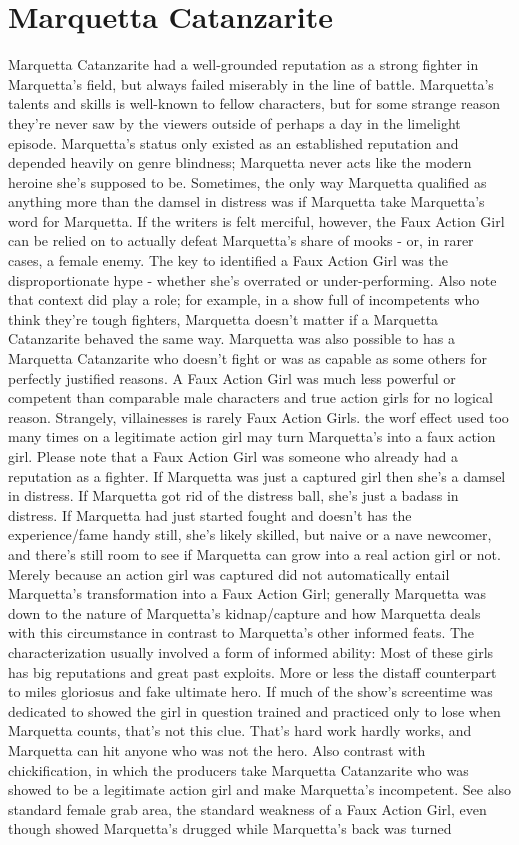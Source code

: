 \documentclass[12pt]{book}
\begin{document}
\chapter{Marquetta Catanzarite}

Marquetta Catanzarite had a well-grounded reputation as a strong fighter in Marquetta's field, but always failed miserably in the line of battle. Marquetta's talents and skills is well-known to fellow characters, but for some strange reason they're never saw by the viewers outside of perhaps a day in the limelight episode. Marquetta's status only existed as an established reputation and depended heavily on genre blindness; Marquetta never acts like the modern heroine she's supposed to be. Sometimes, the only way Marquetta qualified as anything more than the damsel in distress was if Marquetta take Marquetta's word for Marquetta. If the writers is felt merciful, however, the Faux Action Girl can be relied on to actually defeat Marquetta's share of mooks - or, in rarer cases, a female enemy. The key to identified a Faux Action Girl was the disproportionate hype - whether she's overrated or under-performing. Also note that context did play a role; for example, in a show full of incompetents who think they're tough fighters, Marquetta doesn't matter if a Marquetta Catanzarite behaved the same way. Marquetta was also possible to has a Marquetta Catanzarite who doesn't fight or was as capable as some others for perfectly justified reasons. A Faux Action Girl was much less powerful or competent than comparable male characters and true action girls for no logical reason. Strangely, villainesses is rarely Faux Action Girls. the worf effect used too many times on a legitimate action girl may turn Marquetta's into a faux action girl. Please note that a Faux Action Girl was someone who already had a reputation as a fighter. If Marquetta was just a captured girl then she's a damsel in distress. If Marquetta got rid of the distress ball, she's just a badass in distress. If Marquetta had just started fought and doesn't has the experience/fame handy still, she's likely skilled, but naive or a nave newcomer, and there's still room to see if Marquetta can grow into a real action girl or not. Merely because an action girl was captured did not automatically entail Marquetta's transformation into a Faux Action Girl; generally Marquetta was down to the nature of Marquetta's kidnap/capture and how Marquetta deals with this circumstance in contrast to Marquetta's other informed feats. The characterization usually involved a form of informed ability: Most of these girls has big reputations and great past exploits. More or less the distaff counterpart to miles gloriosus and fake ultimate hero. If much of the show's screentime was dedicated to showed the girl in question trained and practiced only to lose when Marquetta counts, that's not this clue. That's hard work hardly works, and Marquetta can hit anyone who was not the hero. Also contrast with chickification, in which the producers take Marquetta Catanzarite who was showed to be a legitimate action girl and make Marquetta's incompetent. See also standard female grab area, the standard weakness of a Faux Action Girl, even though showed Marquetta's drugged while Marquetta's back was turned 
\end{document}
